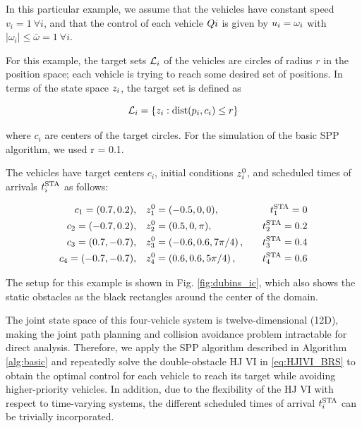 In this particular example, we assume that the vehicles have constant speed $v_i = 1 ~ \forall i$, and that the control of each vehicle $Q{i}$ is given by $u_i = \omega_i$ with $|\omega_i| \le \bar\omega = 1 ~ \forall i$. 

For this example, the target sets $\mathcal{L}_i$ of the vehicles are circles of radius $r$ in the position space; each vehicle is trying to reach some desired set of positions. In terms of the state space $z_i$, the target set is defined as

\begin{equation}
\label{eq:target_sim}
\targetset_i = \{z_i: \dist(p_i, c_i) \le r\}
\end{equation}

\noindent where $c_i$ are centers of the target circles. For the simulation of the basic SPP algorithm, we used r = 0.1.

The vehicles have target centers $c_i$, initial conditions $z_i^0$, and scheduled times of arrivals $t^\text{STA}_i$ as follows:

\begin{equation}
\begin{aligned}
c_1 = (0.7, 0.2), \quad& z_1^0 = (-0.5, 0, 0), \quad & t^\text{STA}_1 = 0 \\
c_2 = (-0.7, 0.2), \quad& z_2^0 = (0.5, 0, \pi), \quad & t^\text{STA}_2 = 0.2 \\
c_3 = (0.7, -0.7), \quad& z_3^0 = \left(-0.6, 0.6, 7\pi/4\right), \quad & t^\text{STA}_3 = 0.4\\
c_4 = (-0.7, -0.7), \quad & z_4^0 = \left(0.6, 0.6, 5\pi/4\right), \quad & t^\text{STA}_4 = 0.6
\end{aligned}
\end{equation}

The setup for this example is shown in Fig. \ref{fig:dubins_ic}, which also shows the static obstacles as the black rectangles around the center of the domain.

The joint state space of this four-vehicle system is twelve-dimensional (12D), making the joint path planning and collision avoidance problem intractable for direct analysis. Therefore, we apply the SPP algorithm described in Algorithm \ref{alg:basic} and repeatedly solve the double-obstacle HJ VI in \eqref{eq:HJIVI_BRS} to obtain the optimal control for each vehicle to reach its target while avoiding higher-priority vehicles. In addition, due to the flexibility of the HJ VI with respect to time-varying systems, the different scheduled times of arrival $t^\text{STA}_i$ can be trivially incorporated. 

